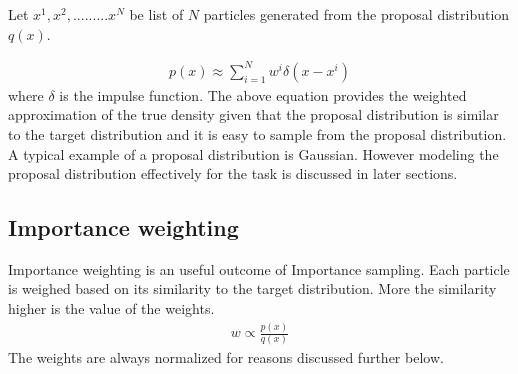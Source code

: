 Let ${x^{1},x^{2},.........x^{N}}$ be list of ${N}$ particles generated from the proposal distribution ${q(x)}$.

\begin{gather} \label{Sample}
    p(x) \approx \sum_{i = 1}^{N} w^{i}\delta (x - x^{i})  
\end{gather} 
where $\delta$ is the impulse function. The above equation provides the weighted approximation of the true density given that the proposal distribution is similar to the target distribution and it is easy to sample from the proposal distribution. A typical example of a proposal distribution is Gaussian. However modeling the proposal distribution effectively for the task is discussed in later sections.

\subsection{Importance weighting}
Importance weighting is an useful outcome of Importance sampling. Each particle is weighed based on its similarity to the target distribution. More the similarity higher is the value of the weights. 
\begin{gather} \label{ImportanceWeigting}
    w \propto \frac{p(x)}{q(x)} 
\end{gather}
The weights are always normalized for reasons discussed further below.

